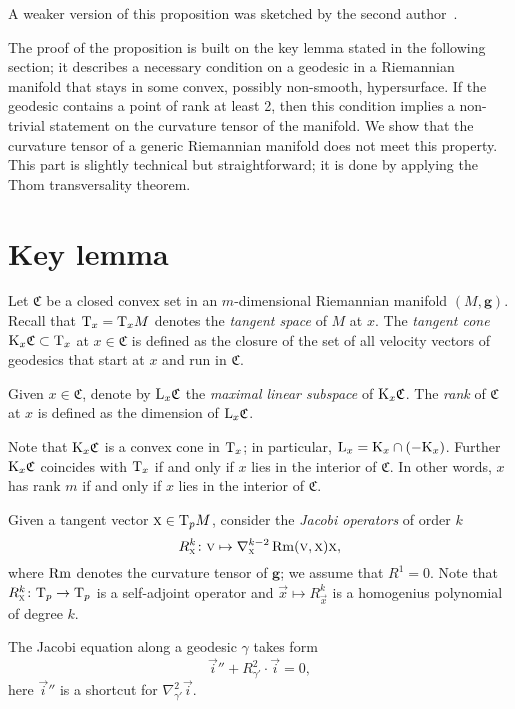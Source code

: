 \documentclass[a4paper,10pt]{article}
\begin{document}
A  weaker version of this proposition was sketched by the second author~\cite{petrunin-2009}.  

The proof of the proposition is built on the key lemma stated in the following section;   
it describes a necessary condition on a geodesic in a Riemannian manifold that stays
in some convex, possibly non-smooth, hypersurface.
If the geodesic contains a point of rank at least 2, then this condition implies a non-trivial
statement on the curvature tensor of the manifold.
We show that the curvature tensor of a generic Riemannian manifold does not meet this property.
This part is slightly technical but straightforward; it is done by applying the Thom transversality theorem.


\section{Key lemma}\label{sec:key}

Let $\mathfrak{C}$ be a closed convex set in an $m$-dimensional Riemannian manifold $(M,\bm{g})$.
Recall that $\mathrm{T}_x=\mathrm{T}_xM$ denotes the \emph{tangent space} of $M$ at $x$.
The \emph{tangent cone} $\mathrm{K}_x\mathfrak{C}\subset \mathrm{T}_x$ at $x\in\mathfrak{C}$ is defined as the closure of the set of all velocity vectors of geodesics that start at $x$ and run in $\mathfrak{C}$.

Given $x\in \mathfrak{C}$, denote by $\mathrm{L}_x\mathfrak{C}$ the \emph{maximal linear subspace} of $\mathrm{K}_x\mathfrak{C}$.
The \emph{rank} of $\mathfrak{C}$ at $x$ is defined as the dimension of $\mathrm{L}_x\mathfrak{C}$.

Note that $\mathrm{K}_x\mathfrak{C}$ is a convex cone in $\mathrm{T}_x$; in particular, $\mathrm{L}_x=\mathrm{K}_x\cap (-\mathrm{K}_x)$.
Further $\mathrm{K}_x\mathfrak{C}$ coincides with 
$\mathrm{T}_x$ if and only if
$x$ lies in the interior of $\mathfrak{C}$.
In other words, $x$ has rank $m$ if and only if $x$ lies in the interior of $\mathfrak{C}$.%


Given a tangent vector $\text{\sc{x}}\in\mathrm{T}_pM$, consider the  \emph{Jacobi operators} of order $k$
\[R^k_{\text{\sc{x}}}\colon\text{\sc{v}}\mapsto \nabla^{k-2}_{\text{\sc{x}}}\operatorname{\rm Rm}(\text{\sc{v}},\text{\sc{x}})\text{\sc{x}},\]
where $\operatorname{\rm Rm}$ denotes the curvature tensor of $\bm{g}$;
we assume that $R^1=0$.
Note that $R^k_{\text{\sc{x}}}\colon\mathrm{T}_p\to \mathrm{T}_p$ is a self-adjoint operator and $\vec{x}\mapsto R^k_{\vec{x}}$ is a homogenius polynomial of degree $k$.

The Jacobi equation along a geodesic $\gamma$ takes form 
\[\vec{i}''+R^2_{\gamma'}\cdot \vec{i}=0,\]
here $\vec{i}''$ is a shortcut for $\nabla^2_{\gamma'}\vec{i}$.
\end{document}
